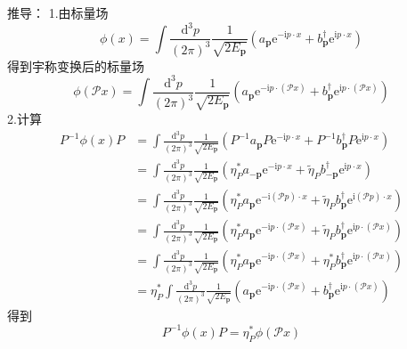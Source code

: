 推导：
1.由标量场
\begin{equation}
    \phi (x)=\int{\frac{\mathrm{d}^3p}{\left( 2\pi \right) ^3}}\frac{1}{\sqrt{2E_{\mathbf{p}}}}\left( a_{\mathbf{p}}\mathrm{e}^{-\mathrm{i}p\cdot x}+b_{\mathbf{p}}^{\dagger}\mathrm{e}^{\mathrm{i}p\cdot x} \right) 
\end{equation}
得到宇称变换后的标量场
\begin{equation}
    \phi (\mathcal{P} x)=\int{\frac{\mathrm{d}^3p}{\left( 2\pi \right) ^3}}\frac{1}{\sqrt{2E_{\mathbf{p}}}}\left( a_{\mathbf{p}}\mathrm{e}^{-\mathrm{i}p\cdot \left( \mathcal{P} x \right)}+b_{\mathbf{p}}^{\dagger}\mathrm{e}^{\mathrm{i}p\cdot \left( \mathcal{P} x \right)} \right) 
\end{equation}
2.计算
\begin{equation}
    \begin{aligned}
        P^{-1}\phi (x)P&=\int{\frac{\mathrm{d}^3p}{\left( 2\pi \right) ^3}}\frac{1}{\sqrt{2E_{\mathbf{p}}}}\left( P^{-1}a_{\mathbf{p}}P\mathrm{e}^{-\mathrm{i}p\cdot x}+P^{-1}b_{\mathbf{p}}^{\dagger}P\mathrm{e}^{\mathrm{i}p\cdot x} \right) 
\\
&=\int{\frac{\mathrm{d}^3p}{\left( 2\pi \right) ^3}}\frac{1}{\sqrt{2E_{\mathbf{p}}}}\left( \eta _{P}^{*}a_{-\mathbf{p}}\mathrm{e}^{-\mathrm{i}p\cdot x}+\tilde{\eta}_Pb_{-\mathbf{p}}^{\dagger}\mathrm{e}^{\mathrm{i}p\cdot x} \right) 
\\
&=\int{\frac{\mathrm{d}^3p}{\left( 2\pi \right) ^3}}\frac{1}{\sqrt{2E_{\mathbf{p}}}}\left( \eta _{P}^{*}a_{\mathbf{p}}\mathrm{e}^{-\mathrm{i}\left( \mathcal{P} p \right) \cdot x}+\tilde{\eta}_Pb_{\mathbf{p}}^{\dagger}\mathrm{e}^{\mathrm{i}\left( \mathcal{P} p \right) \cdot x} \right) 
\\
&=\int{\frac{\mathrm{d}^3p}{\left( 2\pi \right) ^3}}\frac{1}{\sqrt{2E_{\mathbf{p}}}}\left( \eta _{P}^{*}a_{\mathbf{p}}\mathrm{e}^{-\mathrm{i}p\cdot \left( \mathcal{P} x \right)}+\tilde{\eta}_Pb_{\mathbf{p}}^{\dagger}\mathrm{e}^{\mathrm{i}p\cdot \left( \mathcal{P} x \right)} \right) 
\\
&=\int{\frac{\mathrm{d}^3p}{\left( 2\pi \right) ^3}}\frac{1}{\sqrt{2E_{\mathbf{p}}}}\left( \eta _{P}^{*}a_{\mathbf{p}}\mathrm{e}^{-\mathrm{i}p\cdot \left( \mathcal{P} x \right)}+\eta _{P}^{*}b_{\mathbf{p}}^{\dagger}\mathrm{e}^{\mathrm{i}p\cdot \left( \mathcal{P} x \right)} \right) 
\\
&=\eta _{P}^{*}\int{\frac{\mathrm{d}^3p}{\left( 2\pi \right) ^3}}\frac{1}{\sqrt{2E_{\mathbf{p}}}}\left( a_{\mathbf{p}}\mathrm{e}^{-\mathrm{i}p\cdot \left( \mathcal{P} x \right)}+b_{\mathbf{p}}^{\dagger}\mathrm{e}^{\mathrm{i}p\cdot \left( \mathcal{P} x \right)} \right) 
    \end{aligned}
\end{equation}
得到
\begin{equation}
    P^{-1}\phi (x)P=\eta _{P}^{*}\phi (\mathcal{P} x)
\end{equation}


